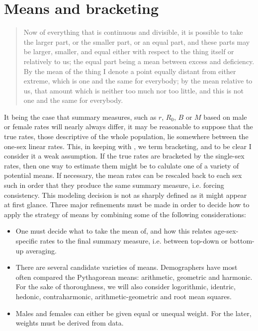 \section{Means and bracketing}

\begin{singlespace}
\begin{quote}
Now of everything that is continuous and divisible, it is possible to take the larger part, or the smaller part, or an equal part, and these parts may be larger, smaller, and equal either with respect to the thing itself or relatively to us; the equal part being a mean between excess and deficiency. By the mean of the thing I denote a point equally distant from either extreme, which is one and the same for everybody; by the mean relative to us, that amount which is neither too much nor too little, and this is not one and the same for everybody.
\end{quote}
\end{singlespace}


It being the case that summary measures, such as $r$, $R_0$, $B$ or $M$ based on male or female rates will nearly always differ, it may be reasonable to suppose that the true rates, those descriptive of the whole population, lie somewhere between the one-sex linear rates. This, in keeping with \citet{yellin1977comparison}, we term bracketing, and to be clear I consider it a weak assumption. If the true rates are bracketed by the single-sex rates, then one way to estimate them might be to calulate one of a variety of potential means. If necessary, the mean rates can be rescaled back to each sex such in order that they produce the same summary measure, i.e. forcing consistency. This modeling decision is not as sharply defined as it might appear at first glance. Three major refinements must be made in order to decide how to apply the strategy of means by combining some of the following considerations:

\begin{itemize}
\item One must decide what to take the mean of, and how this relates age-sex-specific rates to the final summary measure, i.e. between top-down or bottom-up averaging.
\item There are several candidate varieties of means. Demographers have most often compared the Pythagorean means: arithmetic, geometric and harmonic. For the sake of thoroughness, we will also consider logorithmic, identric, hedonic, contraharmonic, arithmetic-geometric and root mean squares.
\item Males and females can either be given equal or unequal weight. For the later, weights must be derived from data.
\end{itemize}

